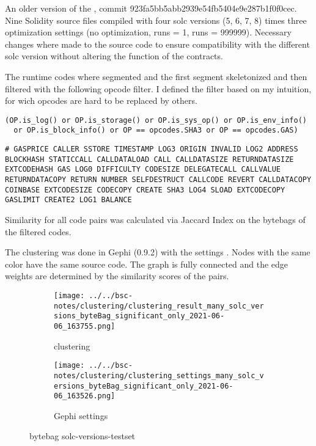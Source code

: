 \documentclass[../main.tex]{subfiles}
\begin{document}
An older version of the , commit 923fa5bb5abb2939e54fb5404e9e287b1f0f0cec.
Nine Solidity source files compiled with four solc versions (5, 6, 7, 8) times three optimization
settings (no optimization, runs = 1, runs = 999999).
Necessary changes where made to the source code to ensure compatibility with the different solc
version without altering the function of the contracts.

The runtime codes where segmented and the first segment skeletonized and then filtered with the following opcode filter. I defined the filter based on my intuition, for wich opcodes are hard to be replaced by others.
\begin{lstlisting}[style=pymd]
(OP.is_log() or OP.is_storage() or OP.is_sys_op() or OP.is_env_info()
  or OP.is_block_info() or OP == opcodes.SHA3 or OP == opcodes.GAS)
\end{lstlisting}
\begin{lstlisting}[style=pysm]
# GASPRICE CALLER SSTORE TIMESTAMP LOG3 ORIGIN INVALID LOG2 ADDRESS BLOCKHASH STATICCALL CALLDATALOAD CALL CALLDATASIZE RETURNDATASIZE EXTCODEHASH GAS LOG0 DIFFICULTY CODESIZE DELEGATECALL CALLVALUE RETURNDATACOPY RETURN NUMBER SELFDESTRUCT CALLCODE REVERT CALLDATACOPY COINBASE EXTCODESIZE CODECOPY CREATE SHA3 LOG4 SLOAD EXTCODECOPY GASLIMIT CREATE2 LOG1 BALANCE
\end{lstlisting}

Similarity for all code pairs was calculated via Jaccard Index on the bytebags of the filtered codes.

The clustering  was done in Gephi (0.9.2) with the settings .
Nodes with the same color have the same source code.
The graph is fully connected and the edge weights are determined by the similarity scores of the pairs.

\begin{figure}[ht!]
  \begin{subfigure}[c]{.6\linewidth}
    \texttt{[image: ../../bsc-notes/clustering/clustering\_result\_many\_solc\_versions\_byteBag\_significant\_only\_2021-06-06\_163755.png]}
    \caption{clustering}
    \label{fig:solc_bytebag_cluster}
  \end{subfigure}%
  \begin{subfigure}[c]{.4\linewidth}
    \texttt{[image: ../../bsc-notes/clustering/clustering\_settings\_many\_solc\_versions\_byteBag\_significant\_only\_2021-06-06\_163526.png]}
    \caption{Gephi settings}
    \label{fig:solc_bytebag_cluster_settings}
  \end{subfigure}
  \caption{bytebag solc-versions-testset}
\end{figure}
\end{document}
